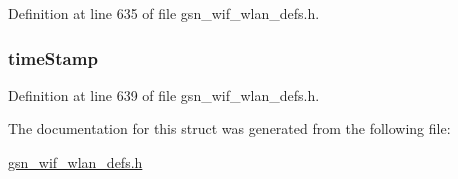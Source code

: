 Definition at line 635 of file gsn\_\-wif\_\-wlan\_\-defs.h.

\hypertarget{a00308_ae7eca8d649117ff5c69fbfcfa178898f}{
\subsubsection[{timeStamp}]{ {\bf timeStamp}}}
\label{a00308_ae7eca8d649117ff5c69fbfcfa178898f}


Definition at line 639 of file gsn\_\-wif\_\-wlan\_\-defs.h.



The documentation for this struct was generated from the following file:\begin{DoxyCompactItemize}
\item 
\hyperlink{a00613}{gsn\_\-wif\_\-wlan\_\-defs.h}\end{DoxyCompactItemize}
